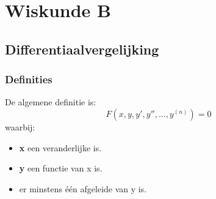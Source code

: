 \part{Wiskunde B}
\chapter{Differentiaalvergelijking}
\section{Definities}
De algemene definitie is:
$$F(x, y, y', y'', ..., y^{(n)}) = 0$$
waarbij: \begin{itemize}
\item \textbf{x} een veranderlijke is.
\item \textbf{y} een functie van x is.
\item er minstens één afgeleide van y is.
\end{itemize}

